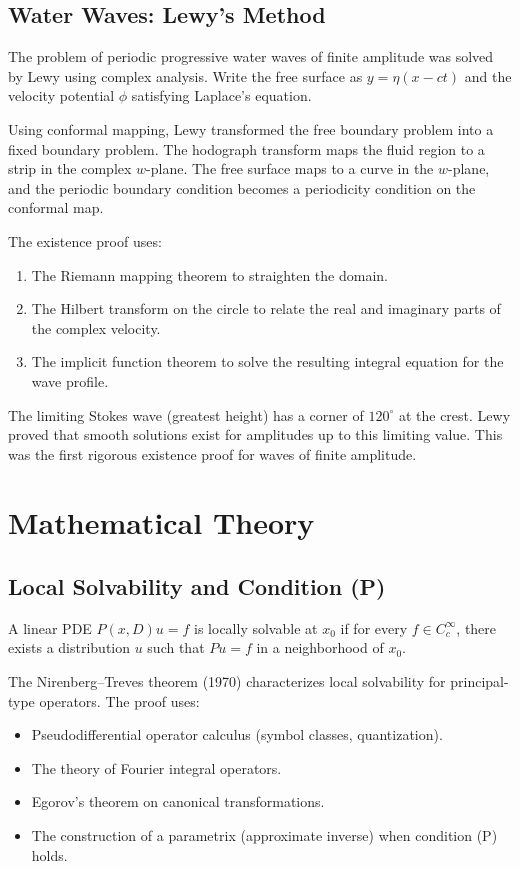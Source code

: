 \subsection{Water Waves: Lewy's Method}

The problem of periodic progressive water waves of finite amplitude was solved by Lewy using complex analysis. Write the free surface as $y = \eta(x - ct)$ and the velocity potential $\phi$ satisfying Laplace's equation.

Using conformal mapping, Lewy transformed the free boundary problem into a fixed boundary problem. The hodograph transform maps the fluid region to a strip in the complex $w$-plane. The free surface maps to a curve in the $w$-plane, and the periodic boundary condition becomes a periodicity condition on the conformal map.

The existence proof uses:
\begin{enumerate}
    \item The Riemann mapping theorem to straighten the domain.
    \item The Hilbert transform on the circle to relate the real and imaginary parts of the complex velocity.
    \item The implicit function theorem to solve the resulting integral equation for the wave profile.
\end{enumerate}

The limiting Stokes wave (greatest height) has a corner of $120^\circ$ at the crest. Lewy proved that smooth solutions exist for amplitudes up to this limiting value. This was the first rigorous existence proof for waves of finite amplitude.

\section{Mathematical Theory}

\subsection{Local Solvability and Condition (P)}

A linear PDE $P(x, D)u = f$ is locally solvable at $x_0$ if for every $f \in C_c^\infty$, there exists a distribution $u$ such that $Pu = f$ in a neighborhood of $x_0$.

The Nirenberg--Treves theorem (1970) characterizes local solvability for principal-type operators. The proof uses:
\begin{itemize}
    \item Pseudodifferential operator calculus (symbol classes, quantization).
    \item The theory of Fourier integral operators.
    \item Egorov's theorem on canonical transformations.
    \item The construction of a parametrix (approximate inverse) when condition (P) holds.
\end{itemize}

